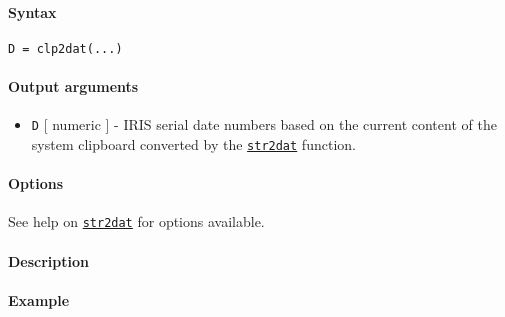 


	\paragraph{Syntax}\label{syntax}

\begin{verbatim}
D = clp2dat(...)
\end{verbatim}

\paragraph{Output arguments}\label{output-arguments}

\begin{itemize}
\itemsep1pt\parskip0pt
\item
  \texttt{D} {[} numeric {]} - IRIS serial date numbers based on the
  current content of the system clipboard converted by the
  \href{dates/str2dat}{\texttt{str2dat}} function.
\end{itemize}

\paragraph{Options}\label{options}

See help on \href{dates/str2dat}{\texttt{str2dat}} for options
available.

\paragraph{Description}\label{description}

\paragraph{Example}\label{example}


